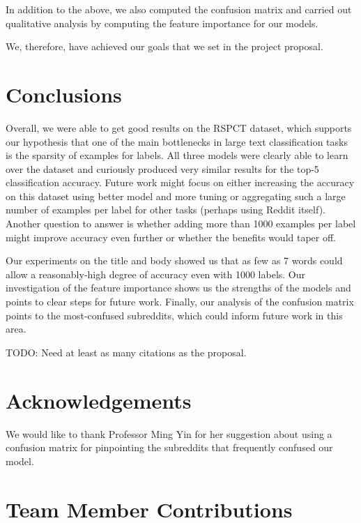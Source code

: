 \documentclass{sig-alternate-05-2015}
\begin{document}
In addition to the above, we also computed the confusion matrix and carried out qualitative analysis by computing the feature importance for our models.

We, therefore, have achieved our goals that we set in the project proposal.

\section{Conclusions}

Overall, we were able to get good results on the RSPCT dataset, which supports our hypothesis that one of the main bottlenecks in large text classification tasks is the sparsity of examples for labels. All three models were clearly able to learn over the dataset and curiously produced very similar results for the top-5 classification accuracy. Future work might focus on either increasing the accuracy on this dataset using better model and more tuning or aggregating such a large number of examples per label for other tasks (perhaps using Reddit itself). Another question to answer is whether adding more than 1000 examples per label might improve accuracy even further or whether the benefits would taper off.

Our experiments on the title and body showed us that as few as 7 words could allow a reasonably-high degree of accuracy even with 1000 labels. Our investigation of the feature importance shows us the strengths of the models and points to clear steps for future work. Finally, our analysis of the confusion matrix points to the most-confused subreddits, which could inform future work in this area.

TODO: Need at least as many citations as the proposal.

\section{Acknowledgements}

We would like to thank Professor Ming Yin for her suggestion about using a confusion matrix for pinpointing the subreddits that frequently confused our model.

\section{Team Member Contributions}


%

%
\end{document}
